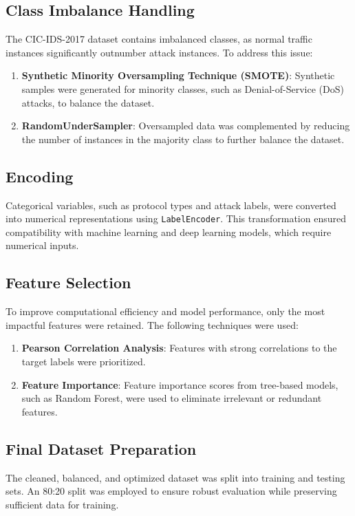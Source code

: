 \documentclass[conference]{IEEEtran}
\begin{document}
\subsection{Class Imbalance Handling}
The CIC-IDS-2017 dataset contains imbalanced classes, as normal traffic instances significantly outnumber attack instances. To address this issue:
\begin{enumerate}[label=\roman*.]
    \item \textbf{Synthetic Minority Oversampling Technique (SMOTE)}: Synthetic samples were generated for minority classes, such as Denial-of-Service (DoS) attacks, to balance the dataset.
    \item \textbf{RandomUnderSampler}: Oversampled data was complemented by reducing the number of instances in the majority class to further balance the dataset.
\end{enumerate}

\subsection{Encoding}
Categorical variables, such as protocol types and attack labels, were converted into numerical representations using \texttt{LabelEncoder}. This transformation ensured compatibility with machine learning and deep learning models, which require numerical inputs.

\subsection{Feature Selection}
To improve computational efficiency and model performance, only the most impactful features were retained. The following techniques were used:
\begin{enumerate}[label=\roman*.]
    \item \textbf{Pearson Correlation Analysis}: Features with strong correlations to the target labels were prioritized.
    \item \textbf{Feature Importance}: Feature importance scores from tree-based models, such as Random Forest, were used to eliminate irrelevant or redundant features.
\end{enumerate}

\subsection{Final Dataset Preparation}
The cleaned, balanced, and optimized dataset was split into training and testing sets. An 80:20 split was employed to ensure robust evaluation while preserving sufficient data for training.
\end{document}
